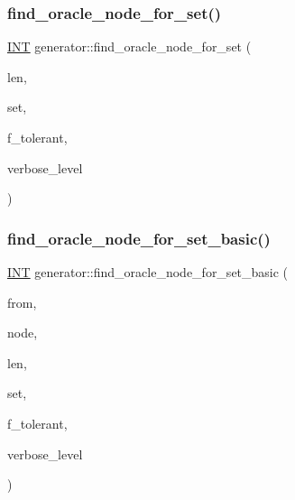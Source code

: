 \mbox{\label{classgenerator_acdf58f4d0bdb6a88af63cdd5fb5d6bff}} 
\subsubsection{\texorpdfstring{find\+\_\+oracle\+\_\+node\+\_\+for\+\_\+set()}{find\_oracle\_node\_for\_set()}}
{\footnotesize\ttfamily \mbox{\hyperlink{galois_8h_a09fddde158a3a20bd2dcadb609de11dc}{I\+NT}} generator\+::find\+\_\+oracle\+\_\+node\+\_\+for\+\_\+set (\begin{DoxyParamCaption}\item[{\mbox{\hyperlink{galois_8h_a09fddde158a3a20bd2dcadb609de11dc}{I\+NT}}}]{len,  }\item[{\mbox{\hyperlink{galois_8h_a09fddde158a3a20bd2dcadb609de11dc}{I\+NT}} $\ast$}]{set,  }\item[{\mbox{\hyperlink{galois_8h_a09fddde158a3a20bd2dcadb609de11dc}{I\+NT}}}]{f\+\_\+tolerant,  }\item[{\mbox{\hyperlink{galois_8h_a09fddde158a3a20bd2dcadb609de11dc}{I\+NT}}}]{verbose\+\_\+level }\end{DoxyParamCaption})}

\mbox{\label{classgenerator_aef74bcab80fb84791767d56f6cc1464f}} 
\subsubsection{\texorpdfstring{find\+\_\+oracle\+\_\+node\+\_\+for\+\_\+set\+\_\+basic()}{find\_oracle\_node\_for\_set\_basic()}}
{\footnotesize\ttfamily \mbox{\hyperlink{galois_8h_a09fddde158a3a20bd2dcadb609de11dc}{I\+NT}} generator\+::find\+\_\+oracle\+\_\+node\+\_\+for\+\_\+set\+\_\+basic (\begin{DoxyParamCaption}\item[{\mbox{\hyperlink{galois_8h_a09fddde158a3a20bd2dcadb609de11dc}{I\+NT}}}]{from,  }\item[{\mbox{\hyperlink{galois_8h_a09fddde158a3a20bd2dcadb609de11dc}{I\+NT}}}]{node,  }\item[{\mbox{\hyperlink{galois_8h_a09fddde158a3a20bd2dcadb609de11dc}{I\+NT}}}]{len,  }\item[{\mbox{\hyperlink{galois_8h_a09fddde158a3a20bd2dcadb609de11dc}{I\+NT}} $\ast$}]{set,  }\item[{\mbox{\hyperlink{galois_8h_a09fddde158a3a20bd2dcadb609de11dc}{I\+NT}}}]{f\+\_\+tolerant,  }\item[{\mbox{\hyperlink{galois_8h_a09fddde158a3a20bd2dcadb609de11dc}{I\+NT}}}]{verbose\+\_\+level }\end{DoxyParamCaption})}

